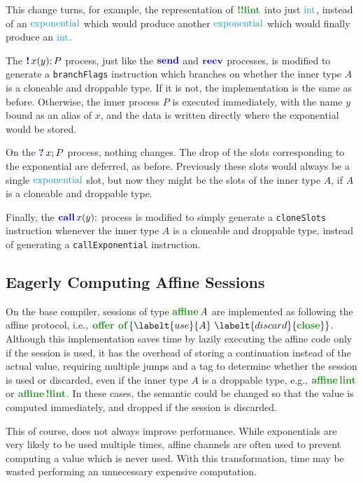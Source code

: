 This change turns, for example, the representation of $\bangt{\bangt{\lintt}}$ into just $\ints$, instead of an $\exponentials$ which would produce another $\exponentials$ which would finally produce an $\ints$.

The $\bangc{x}{y}{P}$ process, just like the $\sendp$ and $\recvp$ processes, is modified to generate a \texttt{branchFlags} instruction which branches on whether the inner type $A$ is a cloneable and droppable type. If it is not, the implementation is the same as before. Otherwise, the inner process $P$ is executed immediately, with the name $y$ bound as an alias of $x$, and the data is written directly where the exponential would be stored.

On the $\whynotc{x}{P}$ process, nothing changes. The drop of the slots corresponding to the exponential are deferred, as before. Previously these slots would always be a single $\exponentials$ slot, but now they might be the slots of the inner type $A$, if $A$ is a cloneable and droppable type.

Finally, the $\callc{x}{y}$ process is modified to simply generate a \texttt{cloneSlots} instruction whenever the inner type $A$ is a cloneable and droppable type, instead of generating a \texttt{callExponential} instruction.

\subsection{Eagerly Computing Affine Sessions} \label{subsection:AffineValueOptimizations}

On the base compiler, sessions of type $\affinet{A}$ are implemented as following the affine protocol, i.e., $\offert{\labelt{use}{A}\ \labelt{discard}{\closet}}$. Although this implementation saves time by lazily executing the affine code only if the session is used, it has the overhead of storing a continuation instead of the actual value, requiring multiple jumps and a tag to determine whether the session is used or discarded, even if the inner type $A$ is a droppable type, e.g., $\affinet{\lintt}$ or $\affinet{\bangt{\lintt}}$. In these cases, the semantic could be changed so that the value is computed immediately, and dropped if the session is discarded.

This of course, does not always improve performance. While exponentials are very likely to be used multiple times, affine channels are often used to prevent computing a value which is never used. With this transformation, time may be wasted performing an unnecessary expensive computation.

